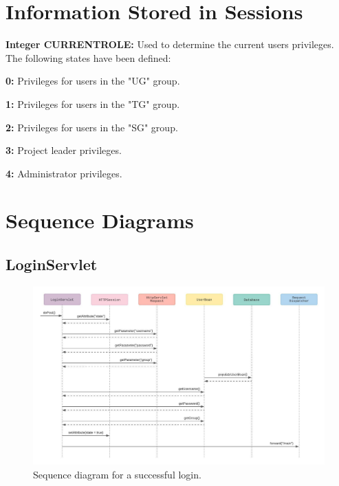 \documentclass{article}
\begin{document}
\section{Information Stored in Sessions}

\textbf{Integer CURRENT\textunderscore ROLE:} Used to determine the current users privileges. The following states have been defined:
\medskip

\indent \textbf{0:} Privileges for users in the "UG" group.

\indent \textbf{1:} Privileges for users in the "TG" group.

\indent \textbf{2:} Privileges for users in the "SG" group.

\indent \textbf{3:} Project leader privileges.

\indent \textbf{4:} Administrator privileges.

\pagebreak
\section{Sequence Diagrams}
\subsection{LoginServlet}

\begin{figure}[H]
    \centering
    \includegraphics[scale=0.4]{images/successfulLogin.jpeg}
    \caption{Sequence diagram for a successful login.}
    \label{fig:successfulLogin}
\end{figure}
\end{document}
